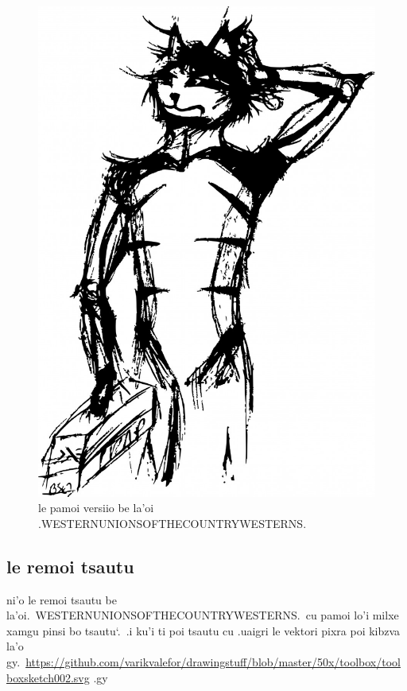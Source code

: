\documentclass{report}
\newcommand\sds{\spacefactor\sfcode`.\ \space}
\begin{document}
\begin{figure}[ht]
	\centering
	\includegraphics[keepaspectratio, width=\textwidth, height=0.75\textheight]{50x/toolbox/s1v1.jpg}
	\caption[center]{le pamoi versiio be la'oi .WESTERNUNIONSOFTHECOUNTRYWESTERNS.}
\end{figure}
\subsection{le remoi tsautu}
ni'o le remoi tsautu be la'oi.\ WESTERNUNIONSOFTHECOUNTRYWESTERNS.\ cu pamoi lo'i milxe xamgu pinsi bo tsautu\sds  .i ku'i ti poi tsautu cu .uaigri le vektori pixra poi kibzva la'o gy.\ \url{https://github.com/varikvalefor/drawingstuff/blob/master/50x/toolbox/toolboxsketch002.svg} .gy
\end{document}
